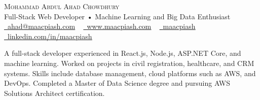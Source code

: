\documentclass[12pt,a4paper]{article}
\newcommand{\resumeSubHeadingListStart}{\begin{itemize}[leftmargin=0.0in, label={}]\itemsep0.75em}
\newcommand{\resumeSubHeadingListEnd}{\end{itemize}}
\begin{document}
\begin{center}
  {\Huge \scshape Mohammad Abdul Ahad Chowdhury} \\ \vspace{5pt}
  Full-Stack Web Developer • Machine Learning and Big Data Enthusiast \\ \vspace{5pt}
  \small \href{mailto:ahad@maacpiash.com}{\raisebox{-0.2\height}\faEnvelope\  \underline{ahad@maacpiash.com}} ~ \href{https://www.maacpiash.com}{\raisebox{-0.2\height}\faGlobe\ \underline{www.maacpiash.com}} ~ \href{https://github.com/maacpiash}{\raisebox{-0.2\height}\faGithub\ \underline{maacpiash}} ~
  \href{https://linkedin.com/in/maacpiash}{\raisebox{-0.2\height}\faLinkedin\ \underline{linkedin.com/in/maacpiash}}
  \vspace{5pt}
\end{center}



\begin{justify}
  A full-stack developer experienced in React.js, Node.js, ASP.NET Core, and machine learning. Worked on projects in civil registration, healthcare, and CRM systems. Skills include database management, cloud platforms such as AWS, and DevOps. Completed a Master of Data Science degree and pursuing AWS Solutions Architect certification.
\end{justify}
\end{document}
